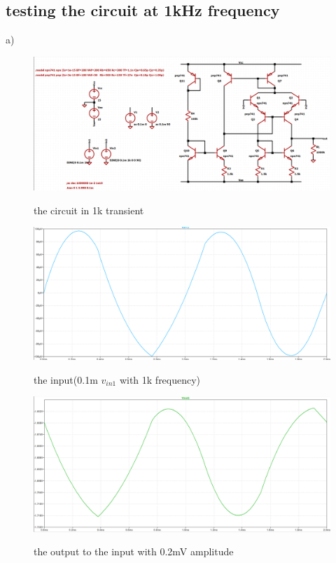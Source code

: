 \documentclass[11pt]{article}
\begin{document}
\subsection{testing the circuit at 1kHz frequency}
a)
\begin{figure}[H]
    \begin{center}
        \includegraphics[scale=0.45]{Fig/1k-circuit.png}
        \label{fig:1ktransientCircuit}
        \caption{the circuit in 1k transient}
    \end{center}
\end{figure}

\begin{figure}[H]
    \begin{center}
        \includegraphics[scale=0.45]{Fig/1k-input.png}
        \label{fig:1kfreqinput}
        \caption{the input(0.1m $v_{in1}$ with 1k frequency)}
    \end{center}
\end{figure}

\begin{figure}[H]
    \begin{center}
        \includegraphics[scale=0.45]{Fig/1k-output.png}
        \label{fig:1kfreqout}
        \caption{the output to the input with 0.2mV amplitude}
    \end{center}
\end{figure}
\end{document}
